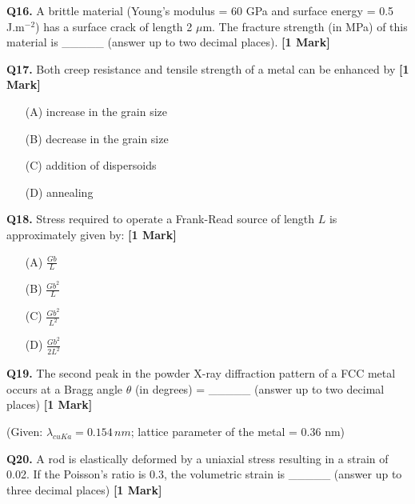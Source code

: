 \documentclass[11pt]{article}
\newcommand{\questiona}[2]{
    \noindent\textbf{Q#2.} #1 \hfill \textbf{[1 Mark]}
}
\begin{document}
\questiona{A brittle material (Young's modulus = 60 GPa and surface energy = 0.5 J.m\(^{-2}\)) has a surface crack of length 2 \(\mu\)m. The fracture strength (in MPa) of this material is \_\_\_\_\_ (answer up to two decimal places).}{16}
\vspace{0.5cm}

\questiona{Both creep resistance and tensile strength of a metal can be enhanced by}{17}
\begin{enumerate}
    \item[(A)] increase in the grain size
    \item[(B)] decrease in the grain size
    \item[(C)] addition of dispersoids
    \item[(D)] annealing
\end{enumerate}
\vspace{0.5cm}

\questiona{Stress required to operate a Frank-Read source of length \(L\) is approximately given by:}{18}
\begin{enumerate}
    \item[(A)] \( \frac{Gb}{L} \)
    \item[(B)] \( \frac{Gb^2}{L} \)
    \item[(C)] \( \frac{Gb^2}{L^2} \)
    \item[(D)] \( \frac{Gb^2}{2L^2} \)
\end{enumerate}
\vspace{0.5cm}

\questiona{The second peak in the powder X-ray diffraction pattern of a FCC metal occurs at a Bragg angle \(\theta\) (in degrees) = \_\_\_\_\_ (answer up to two decimal places)}{19}
(Given: \(\lambda_{cuKa} = 0.154 \, nm\); lattice parameter of the metal = 0.36 nm)
\vspace{0.5cm}

\questiona{A rod is elastically deformed by a uniaxial stress resulting in a strain of 0.02. If the Poisson's ratio is 0.3, the volumetric strain is \_\_\_\_\_ (answer up to three decimal places)}{20}
\vspace{0.5cm}
\end{document}
